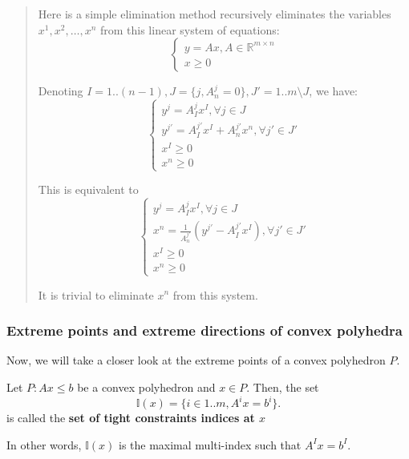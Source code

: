 \begin{quote}
  Here is a simple elimination method recursively eliminates the variables \( x^{1}, x^  {2},  \ldots , x^{n} \) from this linear system of equations:
  \begin{equation*}
  \begin{cases}
    y = Ax, A \in \mathbb{R}^{m\times n} \\
    x \ge  0
  \end{cases}
  \end{equation*}

  Denoting \( I = 1..(n-1), J = \{j, A^{j}_{n} = 0\}, J' = 1..m \setminus J
  \), we have:
  \begin{equation*}
  \begin{cases}
    y^{j} = A^{j}_{I}x^{I}, \forall  j \in J \\
    y^{j'} = A^{j'}_{I}x^{I} + A^{j'}_{n}x^{n}, \forall  j' \in J' \\
    x^{I} \ge  0 \\
    x^{n} \ge 0
  \end{cases}
  \end{equation*}

  This is equivalent to
  \begin{equation*}
  \begin{cases}
    y^{j} = A^{j}_{I}x^{I}, \forall  j \in J \\
    x^{n} = \frac{1}{A^{j'}_{n}}(y^{j'} - A^{j'}_{I}x^{I}), \forall  j' \in J'\\
    x^{I} \ge  0 \\
    x^{n} \ge 0
  \end{cases}
  \end{equation*}

  It is trivial to eliminate \( x^{n} \) from this system.
\end{quote}

\subsubsection{Extreme points and extreme directions of convex polyhedra} %
\label{sec:Extreme points and extreme directions of convex polyhedra}

Now, we will take a closer look at the extreme points of a convex polyhedron \(
P\).

\begin{definition}
\label{def:Tight constraints}
Let \( P: Ax \le  b \) be a convex polyhedron and \( x \in P \). Then, the set
\[
  \mathbb{I}(x) = \{i \in 1..m, A^{i}x = b^{i}\}  
.\] is called the \textbf{set of tight constraints indices at \( x \)}

In other words, \( \mathbb{I}(x) \) is the maximal multi-index such that \(
A^{I}x = b^{I} \).
\end{definition}

